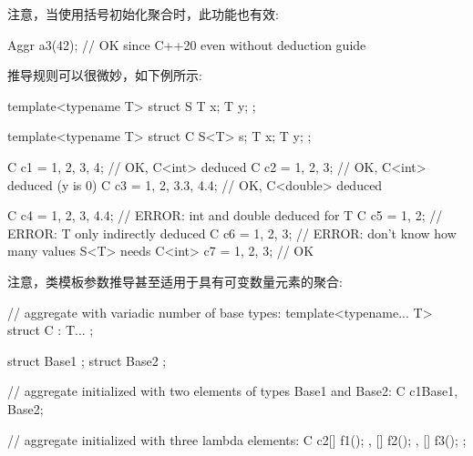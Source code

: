 注意，当使用括号初始化聚合时，此功能也有效:

\begin{cpp}
Aggr a3(42); // OK since C++20 even without deduction guide
\end{cpp}

推导规则可以很微妙，如下例所示:

\begin{cpp}
template<typename T>
struct S {
	T x;
	T y;
};

template<typename T>
struct C {
	S<T> s;
	T x;
	T y;
};

C c1 = {{1, 2}, 3, 4}; // OK, C<int> deduced
C c2 = {{1, 2}, 3}; // OK, C<int> deduced (y is 0)
C c3 = {{1, 2}, 3.3, 4.4}; // OK, C<double> deduced

C c4 = {{1, 2}, 3, 4.4}; // ERROR: int and double deduced for T
C c5 = {{1, 2}}; // ERROR: T only indirectly deduced
C c6 = {1, 2, 3}; // ERROR: don’t know how many values S<T> needs
C<int> c7 = {1, 2, 3}; // OK
\end{cpp}

注意，类模板参数推导甚至适用于具有可变数量元素的聚合:

\begin{cpp}
// aggregate with variadic number of base types:
template<typename... T>
struct C : T... {
};

struct Base1 {
};
struct Base2 {
};

// aggregate initialized with two elements of types Base1 and Base2:
C c1{Base1{}, Base2{}};

// aggregate initialized with three lambda elements:
C c2{[] { f1(); },
	[] { f2(); },
	[] { f3(); }
};
\end{cpp}
















